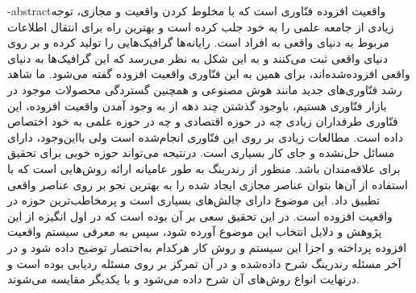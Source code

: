 \documentclass[oneside,openany,mscS]{SBU-Thesis}
\begin{document}
	\fa-abstract{واقعیت افزوده فنّاوری است که با مخلوط کردن واقعیت و مجازی، توجه زیادی از جامعه علمی را به خود جلب کرده است و بهترین راه برای انتقال اطلاعات مربوط به دنیای واقعی به افراد است. رایانه‌ها گرافیک‌هایی را تولید کرده و بر روی دنیای واقعی ثبت می‌کنند و به این شکل به نظر می‌رسد که این گرافیک‌ها به دنیای  واقعی افزوده‌شده‌اند، برای همین به این فنّاوری واقعیت افزوده گفته می‌شود.
		ما شاهد رشد فنّاوری‌های جدید مانند هوش مصنوعی و همچنین گستردگی محصولات موجود در بازار فنّاوری هستیم، باوجود گذشتن چند دهه از به وجود آمدن واقعیت افزوده، این فنّاوری طرفداران زیادی چه در حوزه اقتصادی و چه در حوزه علمی به خود اختصاص داده است.
		مطالعات زیادی بر روی این فنّاوری انجام‌شده است ولی بااین‌وجود، دارای مسائل حل‌نشده و جای کار بسیاری است. درنتیجه می‌تواند حوزه خوبی برای تحقیق برای علاقه‌مندان باشد. منظور از رندرینگ به طور عامیانه ارائه روش‌هایی است که با استفاده از آن‌ها بتوان عناصر مجازی ایجاد شده را به بهترین نحو بر روی عناصر واقعی تطبیق داد. این موضوع دارای چالش‌های بسیاری است و پرمخاطب‌ترین حوزه در واقعیت افزوده است.
		در این تحقیق سعی بر آن بوده است که در اول انگیزه از این پژوهش و دلایل انتخاب این موضوع آورده شود، سپس به معرفی سیستم واقعیت افزوده پرداخته و اجزا این سیستم و روش کار هرکدام به‌اختصار توضیح داده شود  و در آخر مسئله رندرینگ شرح داده‌شده و در آن تمرکز بر روی مسئله ردیابی بوده است و درنهایت انواع روش‌های آن شرح داده می‌شود و با یکدیگر مقایسه می‌شوند.}
	
	
\firstPage %

%	
%	
%	
%	
%	

\end{document}
